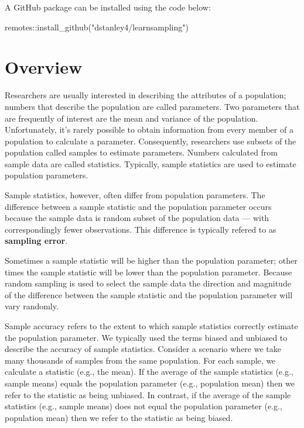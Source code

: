 \documentclass[
]{krantz}
\makeatletter
\newenvironment{Shaded}{\begin{snugshade}}{\end{snugshade}}
\newcommand{\FunctionTok}[1]{\textcolor[rgb]{0,0,0}{#1}}
\newcommand{\NormalTok}[1]{#1}
\newcommand{\SpecialCharTok}[1]{\textcolor[rgb]{0,0,0}{#1}}
\newcommand{\StringTok}[1]{\textcolor[rgb]{0.5,0.5,0.5}{#1}}
\newenvironment{kframe}{%
\medskip{}
\setlength{\fboxsep}{.8em}
 \def\at@end@of@kframe{}%
 \ifinner\ifhmode%
  \def\at@end@of@kframe{\end{minipage}}%
  \begin{minipage}{\columnwidth}%
 \fi\fi%
 \def\FrameCommand##1{\hskip\@totalleftmargin \hskip-\fboxsep
 \colorbox{shadecolor}{##1}\hskip-\fboxsep
     \hskip-\linewidth \hskip-\@totalleftmargin \hskip\columnwidth}%
 \MakeFramed {\advance\hsize-\width
   \@totalleftmargin\z@ \linewidth\hsize
   \@setminipage}}%
 {\par\unskip\endMakeFramed%
 \at@end@of@kframe}
\renewenvironment{Shaded}{\begin{kframe}}{\end{kframe}}
\makeatother
\begin{document}
A GitHub package can be installed using the code below:

\begin{Shaded}
\begin{Highlighting}[]
\NormalTok{remotes}\SpecialCharTok{::}\FunctionTok{install\_github}\NormalTok{(}\StringTok{"dstanley4/learnsampling"}\NormalTok{)}
\end{Highlighting}
\end{Shaded}

\hypertarget{overview}{%
\section{Overview}\label{overview}}

Researchers are usually interested in describing the attributes of a population; numbers that describe the population are called parameters. Two parameters that are frequently of interest are the mean and variance of the population. Unfortunately, it's rarely possible to obtain information from every member of a population to calculate a parameter. Consequently, researchers use subsets of the population called samples to estimate parameters. Numbers calculated from sample data are called statistics. Typically, sample statistics are used to estimate population parameters.

Sample statistics, however, often differ from population parameters. The difference between a sample statistic and the population parameter occurs because the sample data is random subset of the population data --- with correspondingly fewer observations. This difference is typically refered to as \textbf{sampling error}.

Sometimes a sample statistic will be higher than the population parameter; other times the sample statistic will be lower than the population parameter. Because random sampling is used to select the sample data the direction and magnitude of the difference between the sample statistic and the population parameter will vary randomly.

Sample accuracy refers to the extent to which sample statistics correctly estimate the population parameter. We typically used the terms biased and unbiased to describe the accuracy of sample statistics. Consider a scenario where we take many thousands of samples from the same population. For each sample, we calculate a statistic (e.g., the mean). If the average of the sample statistics (e.g., sample means) equals the population parameter (e.g., population mean) then we refer to the statistic as being unbiased. In contrast, if the average of the sample statistics (e.g., sample means) does not equal the population parameter (e.g., population mean) then we refer to the statistic as being biased.
\end{document}
